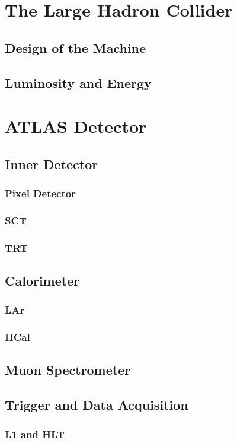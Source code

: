 \documentclass{report}
\begin{document}
\chapter{The Large Hadron Collider}
\label{chap:collider}
\section{Design of the Machine}
\section{Luminosity and Energy}

\chapter{ATLAS Detector}
\label{chap:detector}
\section{Inner Detector}
\subsection{Pixel Detector}
\subsection{SCT}
\subsection{TRT}
\section{Calorimeter}
\subsection{LAr}
\subsection{HCal}
\section{Muon Spectrometer}

\section{Trigger and Data Acquisition}
\subsection{L1 and HLT}
\end{document}

